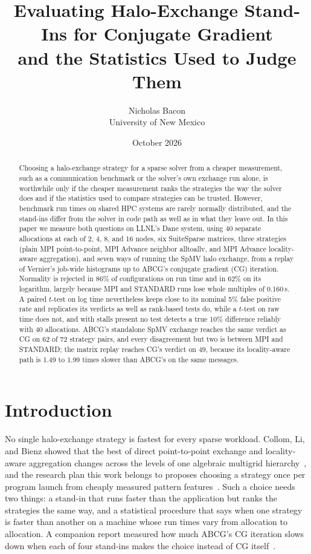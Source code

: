 \documentclass[11pt]{article}
\title{Evaluating Halo-Exchange Stand-Ins for Conjugate Gradient\\and the Statistics Used to Judge Them}
\author{Nicholas Bacon\\University of New Mexico}
\date{October 2026}
\begin{document}
\maketitle

\begin{abstract}
Choosing a halo-exchange strategy for a sparse solver from a cheaper measurement, such as a
communication benchmark or the solver's own exchange run alone, is worthwhile only if the
cheaper measurement ranks the strategies the way the solver does and if the statistics
used to compare strategies can be trusted. However, benchmark run times on shared HPC
systems are rarely normally distributed, and the stand-ins differ from the solver in code
path as well as in what they leave out. In this paper we measure both questions on LLNL's
Dane system, using 40 separate allocations at each of 2, 4, 8, and 16 nodes, six
SuiteSparse matrices, three strategies (plain MPI point-to-point, MPI Advance neighbor
alltoallv, and MPI Advance locality-aware aggregation), and seven ways of running the SpMV
halo exchange, from a replay of Vernier's job-wide histograms up to ABCG's conjugate
gradient (CG) iteration. Normality is rejected in 86\% of configurations on run time and
in 62\% on its logarithm, largely because MPI and STANDARD runs lose whole multiples of
0.160\,s. A paired $t$-test on log time nevertheless keeps close to its nominal 5\% false
positive rate and replicates its verdicts as well as rank-based tests do, while a $t$-test
on raw time does not, and with stalls present no test detects a true 10\% difference
reliably with 40 allocations. ABCG's standalone SpMV exchange reaches the same verdict as
CG on 62 of 72 strategy pairs, and every disagreement but two is between MPI and
STANDARD; the matrix replay reaches CG's verdict on 49, because its locality-aware path is
1.49 to 1.99 times slower than ABCG's on the same messages.
\end{abstract}

\section{Introduction}

No single halo-exchange strategy is fastest for every sparse workload. Collom, Li, and
Bienz showed that the best of direct point-to-point exchange and locality-aware
aggregation changes across the levels of one algebraic multigrid
hierarchy~\cite{collom2023}, and the research plan this work belongs to proposes choosing
a strategy once per program launch from cheaply measured pattern
features~\cite{researchplan}. Such a choice needs two things: a stand-in that runs faster
than the application but ranks the strategies the same way, and a statistical procedure
that says when one strategy is faster than another on a machine whose run times vary from
allocation to allocation. A companion report measured how much ABCG's CG iteration slows
down when each of four stand-ins makes the choice instead of CG
itself~\cite{ladderreport}.
\end{document}
